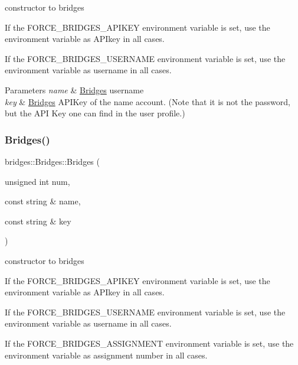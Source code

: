 constructor to bridges 

If the F\+O\+R\+C\+E\+\_\+\+B\+R\+I\+D\+G\+E\+S\+\_\+\+A\+P\+I\+K\+EY environment variable is set, use the environment variable as A\+P\+Ikey in all cases.

If the F\+O\+R\+C\+E\+\_\+\+B\+R\+I\+D\+G\+E\+S\+\_\+\+U\+S\+E\+R\+N\+A\+ME environment variable is set, use the environment variable as username in all cases.


\begin{DoxyParams}{Parameters}
{\em name} & \hyperlink{classbridges_1_1_bridges}{Bridges} username \\
\hline
{\em key} & \hyperlink{classbridges_1_1_bridges}{Bridges} A\+P\+I\+Key of the name account. (Note that it is not the password, but the A\+PI Key one can find in the user profile.) \\
\hline
\end{DoxyParams}
\mbox{\label{classbridges_1_1_bridges_aa58a928530695a5d0e9bf15fa09c8d84}} 
\subsubsection{\texorpdfstring{Bridges()}{Bridges()}\hspace{0.1cm}{\footnotesize\ttfamily [3/3]}}
{\footnotesize\ttfamily bridges\+::\+Bridges\+::\+Bridges (\begin{DoxyParamCaption}\item[{unsigned int}]{num,  }\item[{const string \&}]{name,  }\item[{const string \&}]{key }\end{DoxyParamCaption})\hspace{0.3cm}{\ttfamily [inline]}}



constructor to bridges 

If the F\+O\+R\+C\+E\+\_\+\+B\+R\+I\+D\+G\+E\+S\+\_\+\+A\+P\+I\+K\+EY environment variable is set, use the environment variable as A\+P\+Ikey in all cases.

If the F\+O\+R\+C\+E\+\_\+\+B\+R\+I\+D\+G\+E\+S\+\_\+\+U\+S\+E\+R\+N\+A\+ME environment variable is set, use the environment variable as username in all cases.

If the F\+O\+R\+C\+E\+\_\+\+B\+R\+I\+D\+G\+E\+S\+\_\+\+A\+S\+S\+I\+G\+N\+M\+E\+NT environment variable is set, use the environment variable as assignment number in all cases.


